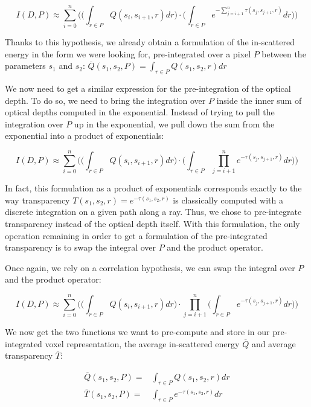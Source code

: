 \begin{equation*}
	I(D,P)\approx \sum^{n}_{i=0}\Bigg(\Bigg( \int_{r\in P}Q(s_i,s_{i+1},r)dr\Bigg)\cdot\Bigg( \int_{r\in P} e^{-\sum^{n}_{j=i+1}\tau(s_j,s_{j+1},r)}dr\Bigg)\Bigg)
\end{equation*}

Thanks to this hypothesis, we already obtain a formulation of the in-scattered energy in the form we were looking for, pre-integrated over a pixel $P$ between the parameters $s_1$ and $s_2$: $\overline{Q}(s_1,s_2,P)=\int_{r\in P}Q(s_1,s_2,r)dr$

We now need to get a similar expression for the pre-integration of the optical depth. To do so, we need to bring the integration over $P$ inside the inner sum of optical depths computed in the exponential. Instead of trying to pull the integration over $P$ up in the exponential, we pull down the sum from the exponential into a product of exponentials:

\begin{equation*}
	I(D,P)\approx \sum^{n}_{i=0}\Bigg(\Bigg( \int_{r\in P}Q(s_i,s_{i+1},r)dr\Bigg)\cdot\Bigg( \int_{r\in P}\prod^{n}_{j=i+1} e^{-\tau(s_j,s_{j+1},r)}dr\Bigg)\Bigg)
\end{equation*}

In fact, this formulation as a product of exponentials corresponds exactly to the way transparency $T(s_1,s_2,r)=e^{-\tau(s_1,s_2,r)}$ is classically computed with a discrete integration on a given path along a ray. Thus, we chose to pre-integrate transparency instead of the optical depth itself. With this formulation, the only operation remaining in order to get a formulation of the pre-integrated transparency is to swap the integral over $P$ and the product operator.

Once again, we rely on a correlation hypothesis, we can swap the integral over $P$ and the product operator:

\begin{equation*}
	I(D,P)\approx \sum^{n}_{i=0}\Bigg(\Bigg( \int_{r\in P}Q(s_i,s_{i+1},r)dr\Bigg)\cdot\prod^{n}_{j=i+1}\Bigg( \int_{r\in P} e^{-\tau(s_j,s_{j+1},r)}dr\Bigg)\Bigg)
\end{equation*}

We now get the two functions we want to pre-compute and store in our pre-integrated voxel representation, the average in-scattered energy $\overline{Q}$ and average transparency $\overline{T}$: 

\begin{equation*}
	\begin{aligned}
		\overline{Q}(s_1,s_2,P)=&\int_{r\in P}Q(s_1,s_2,r)dr\\
		\overline{T}(s_1,s_2,P)=&\int_{r\in P}e^{-\tau(s_1,s_2,r)}dr
	\end{aligned}
\end{equation*}

